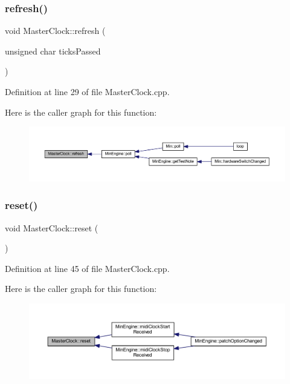 \subsubsection{\texorpdfstring{refresh()}{refresh()}}
{\footnotesize\ttfamily void Master\+Clock\+::refresh (\begin{DoxyParamCaption}\item[{unsigned char}]{ticks\+Passed }\end{DoxyParamCaption})}



Definition at line 29 of file Master\+Clock.\+cpp.

Here is the caller graph for this function\+:
\nopagebreak
\begin{figure}[H]
\begin{center}
\leavevmode
\includegraphics[width=350pt]{d6/dc3/class_master_clock_ae6c0b35db2932b94ec823eac80347707_icgraph}
\end{center}
\end{figure}
\mbox{\label{class_master_clock_a21abae82a775a527de35a198859ce965}} 
\subsubsection{\texorpdfstring{reset()}{reset()}}
{\footnotesize\ttfamily void Master\+Clock\+::reset (\begin{DoxyParamCaption}{ }\end{DoxyParamCaption})}



Definition at line 45 of file Master\+Clock.\+cpp.

Here is the caller graph for this function\+:
\nopagebreak
\begin{figure}[H]
\begin{center}
\leavevmode
\includegraphics[width=350pt]{d6/dc3/class_master_clock_a21abae82a775a527de35a198859ce965_icgraph}
\end{center}
\end{figure}
\mbox{\label{class_master_clock_a5df4dcf8523b8186a7c73f9357376a01}} 
